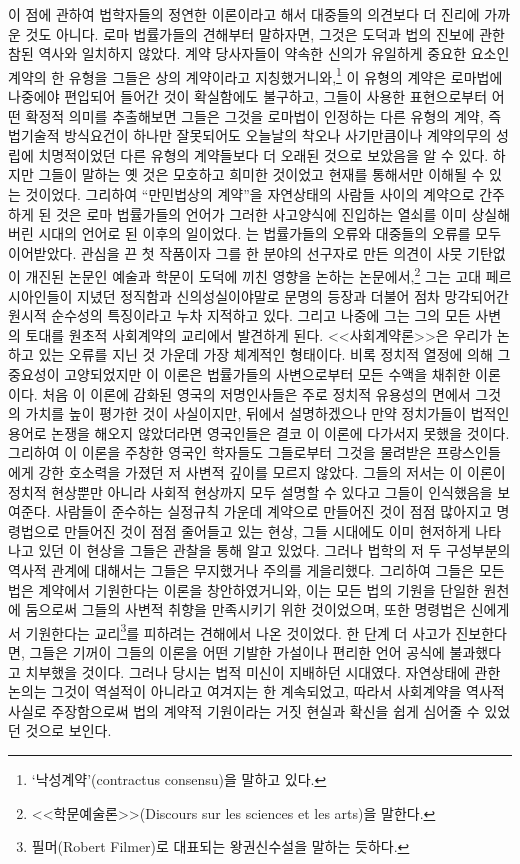 이 점에 관하여 법학자들의 정연한 이론이라고 해서 대중들의 의견보다 더
진리에 가까운 것도 아니다.
로마 법률가들의 견해부터 말하자면,
그것은 도덕과 법의 진보에 관한 참된 역사와 일치하지 않았다.
계약 당사자들이 약속한 신의가 유일하게 중요한 요소인
계약의 한 유형을 그들은 상의 계약이라고
지칭했거니와,\footnote{%
  `낙성계약'(contractus consensu)을 말하고 있다.
  }
이 유형의 계약은 로마법에 나중에야 편입되어 들어간 것이 확실함에도
불구하고,
그들이 사용한 표현으로부터 어떤 확정적 의미를 추출해보면
그들은 그것을 로마법이 인정하는 다른 유형의 계약, 즉
법기술적 방식요건이 하나만 잘못되어도 오늘날의 착오나 사기만큼이나
계약의무의 성립에 치명적이었던 다른 유형의 계약들보다
더 오래된 것으로 보았음을 알 수 있다.
하지만 그들이 말하는 옛 것은 모호하고 희미한 것이었고
현재를 통해서만 이해될 수 있는 것이었다.
그리하여 ``만민법상의 계약''을
자연상태의 사람들 사이의 계약으로 간주하게 된 것은
로마 법률가들의 언어가
그러한 사고양식에 진입하는 열쇠를 이미 상실해버린 시대의 언어로 된
이후의 일이었다.
는 법률가들의 오류와 대중들의 오류를 모두 이어받았다.
관심을 끈 첫 작품이자
그를 한 분야의 선구자로 만든 의견이 사뭇 기탄없이 개진된 논문인
예술과 학문이 도덕에 끼친 영향을 논하는 논문에서,\footnote{%
  <<학문예술론>>(Discours sur les sciences et les arts)을 말한다. }
그는 고대 페르시아인들이 지녔던 정직함과 신의성실이야말로
문명의 등장과 더불어 점차 망각되어간 원시적 순수성의 특징이라고
누차 지적하고 있다.
그리고 나중에 그는
그의 모든 사변의 토대를
원초적 사회계약의 교리에서 발견하게 된다.
<<사회계약론>>은 우리가 논하고 있는 오류를 지닌 것 가운데 가장 체계적인 형태이다.
비록 정치적 열정에 의해 그 중요성이 고양되었지만
이 이론은 법률가들의 사변으로부터
모든 수액을 채취한 이론이다.
처음 이 이론에 감화된 영국의 저명인사들은
주로 정치적 유용성의 면에서 그것의 가치를 높이 평가한 것이 사실이지만,
뒤에서 설명하겠으나
만약 정치가들이 법적인 용어로 논쟁을 해오지 않았더라면
영국인들은 결코 이 이론에 다가서지 못했을 것이다.
그리하여 이 이론을 주창한 영국인 학자들도
그들로부터 그것을 물려받은 프랑스인들에게 강한 호소력을 가졌던
저 사변적 깊이를 모르지 않았다.
그들의 저서는 이 이론이 정치적 현상뿐만 아니라
사회적 현상까지 모두 설명할 수 있다고 그들이 인식했음을 보여준다.
사람들이 준수하는 실정규칙 가운데
계약으로 만들어진 것이 점점 많아지고
명령법으로 만들어진 것이 점점 줄어들고 있는 현상,
그들 시대에도 이미 현저하게 나타나고 있던 이 현상을
그들은 관찰을 통해 알고 있었다.
그러나 법학의 저 두 구성부분의 역사적 관계에 대해서는
그들은 무지했거나 주의를 게을리했다.
그리하여
그들은 모든 법은 계약에서 기원한다는 이론을 창안하였거니와, 이는
모든 법의 기원을 단일한 원천에 둠으로써 그들의 사변적 취향을
만족시키기 위한 것이었으며,
또한
명령법은 신에게서 기원한다는 교리\footnote{%
  필머(Robert Filmer)로 대표되는 왕권신수설을 말하는 듯하다.
}를 피하려는 견해에서 나온 것이었다.
한 단계 더 사고가 진보한다면,
그들은 기꺼이
그들의 이론을
어떤 기발한 가설이나 편리한 언어 공식에 불과했다고
치부했을 것이다.
그러나 당시는 법적 미신이 지배하던 시대였다.
자연상태에 관한 논의는 그것이 역설적이 아니라고 여겨지는 한 계속되었고,
따라서
사회계약을 역사적 사실로 주장함으로써
법의 계약적 기원이라는 거짓 현실과 확신을
쉽게 심어줄 수 있었던 것으로 보인다.

